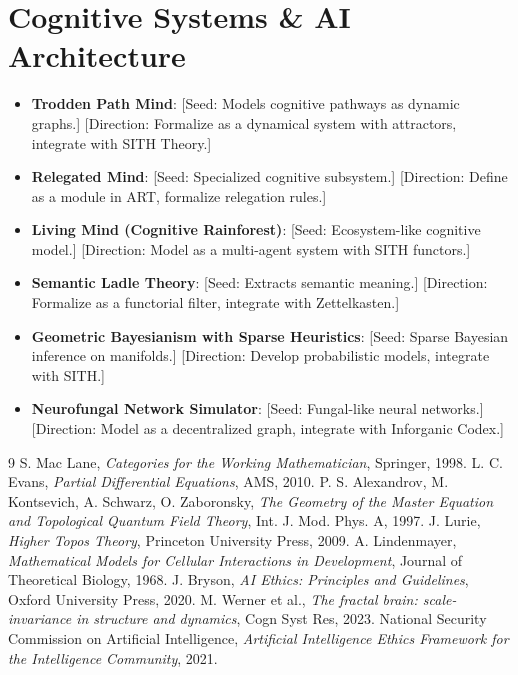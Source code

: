 \documentclass[11pt,oneside]{memoir}
\theoremstyle{plain}
\begin{document}
\section{Cognitive Systems \& AI Architecture}
\begin{itemize}
    \item \textbf{Trodden Path Mind}: [Seed: Models cognitive pathways as dynamic graphs.] [Direction: Formalize as a dynamical system with attractors, integrate with SITH Theory.]
    \item \textbf{Relegated Mind}: [Seed: Specialized cognitive subsystem.] [Direction: Define as a module in ART, formalize relegation rules.]
    \item \textbf{Living Mind (Cognitive Rainforest)}: [Seed: Ecosystem-like cognitive model.] [Direction: Model as a multi-agent system with SITH functors.]
    \item \textbf{Semantic Ladle Theory}: [Seed: Extracts semantic meaning.] [Direction: Formalize as a functorial filter, integrate with Zettelkasten.]
    \item \textbf{Geometric Bayesianism with Sparse Heuristics}: [Seed: Sparse Bayesian inference on manifolds.] [Direction: Develop probabilistic models, integrate with SITH.]
    \item \textbf{Neurofungal Network Simulator}: [Seed: Fungal-like neural networks.] [Direction: Model as a decentralized graph, integrate with Inforganic Codex.]
\end{itemize}


\backmatter

\begin{thebibliography}{9}
S. Mac Lane, \emph{Categories for the Working Mathematician}, Springer, 1998.
L. C. Evans, \emph{Partial Differential Equations}, AMS, 2010.
P. S. Alexandrov, M. Kontsevich, A. Schwarz, O. Zaboronsky, \emph{The Geometry of the Master Equation and Topological Quantum Field Theory}, Int. J. Mod. Phys. A, 1997.
J. Lurie, \emph{Higher Topos Theory}, Princeton University Press, 2009.
A. Lindenmayer, \emph{Mathematical Models for Cellular Interactions in Development}, Journal of Theoretical Biology, 1968.
J. Bryson, \emph{AI Ethics: Principles and Guidelines}, Oxford University Press, 2020.
M. Werner et al., \emph{The fractal brain: scale-invariance in structure and dynamics}, Cogn Syst Res, 2023.
National Security Commission on Artificial Intelligence, \emph{Artificial Intelligence Ethics Framework for the Intelligence Community}, 2021.
\end{thebibliography}
\end{document}

